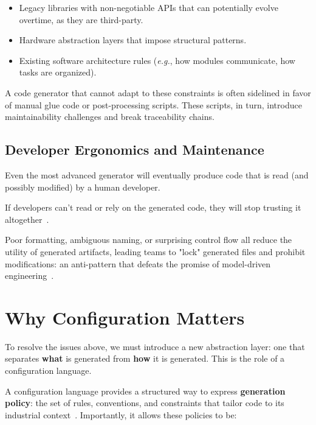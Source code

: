 \begin{itemize}
	\item Legacy libraries with non-negotiable \gls{API}s that can potentially evolve overtime, as they are third-party.
	\item Hardware abstraction layers that impose structural patterns.
	\item Existing software architecture rules (\textit{e.g.}, how modules communicate, how tasks are organized).
\end{itemize}

A code generator that cannot adapt to these constraints is often sidelined in favor of manual glue code or post-processing scripts. These scripts, in turn, introduce maintainability challenges and break traceability chains.

\subsection{Developer Ergonomics and Maintenance}

Even the most advanced generator will eventually produce code that is read (and possibly modified) by a human developer. 

\begin{tcolorbox}[colback=green!8]
	If developers can't read or rely on the generated code, they will stop trusting it altogether~\cite{roychoudhury2025agenticaisoftwareengineers}.
\end{tcolorbox}

Poor formatting, ambiguous naming, or surprising control flow all reduce the utility of generated artifacts, leading teams to "lock" generated files and prohibit modifications: an anti-pattern that defeats the promise of model-driven engineering~\cite{BUSCHHAUS2024103033}.

\section{Why Configuration Matters}
\label{sec:why_configuration_matters}

To resolve the issues above, we must introduce a new abstraction layer: one that separates \textbf{what} is generated from \textbf{how} it is generated. This is the role of a configuration language.

A configuration language provides a structured way to express \textbf{generation policy}: the set of rules, conventions, and constraints that tailor code to its industrial context~\cite{Voelter_Benz_2013}. Importantly, it allows these policies to be:

